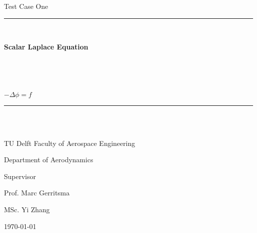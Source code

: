 \thispagestyle{empty} %
\setcounter{page}{0}

\vspace{10 mm}

{\huge \centerline{Test Case One}}

\vspace{10mm}
{\large \centerline{ }}

\vspace{5mm}

\rule{\textwidth}{1pt} \\[0.4cm]
{ \huge \centerline{\bfseries Scalar Laplace Equation} \vspace{0mm}\\
 \huge \centerline{}\vspace{3mm}\\
 \huge \centerline{\bfseries $ -\Delta \phi = f $} \vspace{0mm}}
\rule{\textwidth}{0.3pt} \\[1.5cm]


\vspace{10 mm}

\begin{table}[H]
\centering
\begin{tabular}{ll}

\end{tabular}
\end{table}


\vspace{50mm}

{{\large{\centerline{TU Delft Faculty of Aerospace Engineering}}}
{\large{\centerline {Department of Aerodynamics }}}
{\large{\centerline {}}}
{\large{\centerline {Supervisor}}}
{\large{\centerline {}}}
{\large{\centerline {Prof. Marc Gerritsma}}}
{\large{\centerline {MSc. Yi Zhang}}}
{\large{\centerline {}}}
{\large{\centerline {}}}
{\large{\centerline { }}}
{\large{\centerline{\today}}}}



